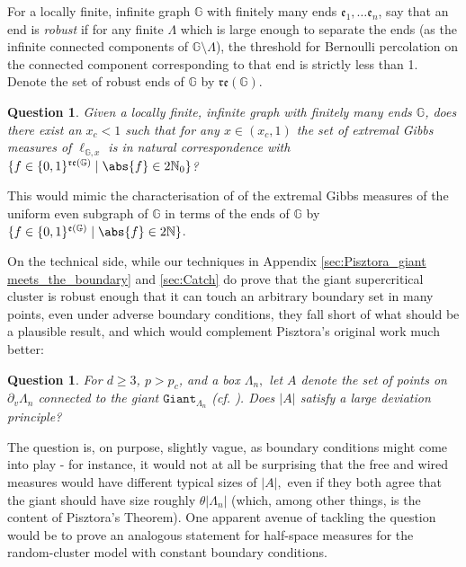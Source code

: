 \documentclass[article,11pt,reqno]{amsart}
\DeclareMathOperator*{\UEG}{UEG}
\newtheorem{question}[theorem]{Question}
\begin{document}
For a locally finite, infinite graph $\mathbb{G}$ with finitely many ends $\mathfrak{e}_1, \dots \mathfrak{e}_n$, say that an end is \emph{robust} if for any finite $\Lambda$ which is large enough to separate the ends (as the infinite connected components of $\mathbb{G} \setminus \Lambda$), the threshold for Bernoulli percolation on the connected component corresponding to that end is strictly less than 1. Denote the set of robust ends of $\mathbb{G}$ by $\mathfrak{re}(\mathbb{G})$.  
\begin{question}
    Given a locally finite, infinite graph with finitely many ends $\mathbb{G}$, does there exist an $x_c < 1$ such that for any $x \in (x_c,1)$ the set of extremal Gibbs measures of $\ell_{\mathbb{G},x}$ is in natural correspondence with $\{f \in \{0,1\}^{\mathfrak{re}(\mathbb{G})}   \mid \abs{f} \in 2\mathbb{N}_0  \}$?
\end{question}
This would mimic the characterisation of \cite[Cor. 3.17]{hansen2023uniform} of the extremal Gibbs measures of the uniform even subgraph of $\mathbb{G}$ %
in terms of the ends of $\mathbb{G}$ by $\{f \in
\{0,1\}^{\mathfrak{e}(\mathbb{G})} \mid \abs{f} \in 2\mathbb{N} \}$.

On the technical side, while our techniques in Appendix \ref{sec:Pisztora_giant meets_the_boundary} and \ref{sec:Catch} do prove that the giant supercritical cluster is robust enough that it can touch an arbitrary boundary set in many points, even under adverse boundary conditions, they fall short of what should be a plausible result, and which would complement Pisztora's original work \cite{Pis96} much better:
\begin{question}
For $d\geq 3$, $p>p_c$, and a box $\Lambda_n,$ let $A$ denote the set of points on $\partial_v\Lambda_n$ connected to the giant $\mathtt{Giant}_{\Lambda_n}$ (cf. ). Does $|A|$ satisfy a large deviation principle? 
\end{question}
The question is, on purpose, slightly vague, as boundary conditions might come into play - for instance, it would not at all be surprising that the free and wired measures would have different typical sizes of $|A|,$ even if they both agree that the giant should have size roughly $\theta|\Lambda_n|$ (which, among other things, is the content of Pisztora's Theorem). One apparent avenue of tackling the question would be to prove an analogous statement for half-space measures for the random-cluster model with constant boundary conditions.
\end{document}
